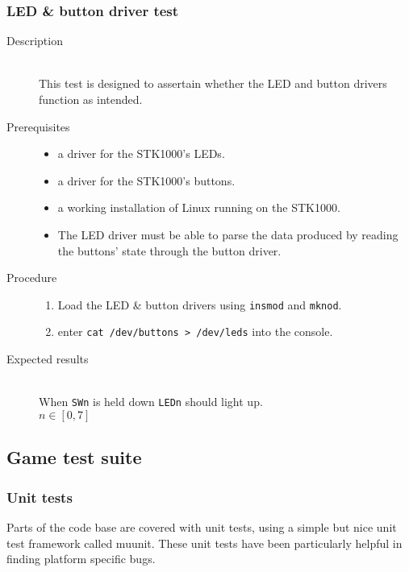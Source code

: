 	\subsubsection{LED \& button driver test}
		\begin{description}
			\item[Description] \hfill \\
				This test is designed to assertain whether the LED and button drivers function as intended.
			\item[Prerequisites] \hfill
				\begin{itemize}
					\item{a driver for the STK1000's LEDs.}
					\item{a driver for the STK1000's buttons.}
					\item{a working installation of Linux running on the STK1000.}
					\item{The LED driver must be able to parse the data produced by reading the buttons' state through the button driver.}
				\end{itemize}
			\item[Procedure] \hfill
				\begin{enumerate}
					\item{Load the LED \& button drivers using \texttt{insmod} and \texttt{mknod}.}
					\item{enter \texttt{cat /dev/buttons > /dev/leds} into the console.}
				\end{enumerate}
			\item[Expected results] \hfill \\
				When \texttt{SWn} is held down \texttt{LEDn} should light up.
				\\$n \in [0,7]$
		\end{description}	

\subsection{Game test suite}

	\subsubsection{Unit tests}

    Parts of the code base are covered with unit tests, using a simple but nice unit test framework called muunit.
    These unit tests have been particularly helpful in finding platform specific bugs.
        

